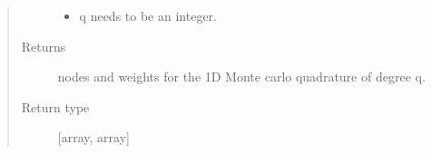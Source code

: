 \documentclass[letterpaper,10pt,english]{sphinxmanual}
\begin{document}
\begin{fulllineitems}
\begin{quote}
\begin{description}
\begin{itemize}
\item {} 
 \textendash{} q needs to be an integer.

\end{itemize}

\item[{Returns}] \leavevmode
nodes and weights for the 1D Monte carlo quadrature of degree q.

\item[{Return type}] \leavevmode
{[}array, array{]}

\end{description}\end{quote}

\end{fulllineitems}

\end{document}
